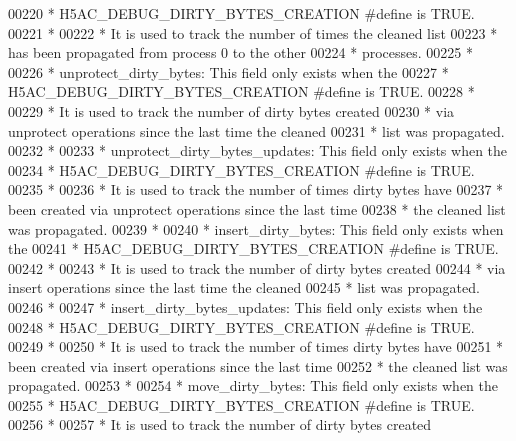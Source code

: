 \begin{DoxyCode}
00220 \textcolor{comment}{ *      H5AC\_DEBUG\_DIRTY\_BYTES\_CREATION #define is TRUE.}
00221 \textcolor{comment}{ *}
00222 \textcolor{comment}{ *      It is used to track the number of times the cleaned list}
00223 \textcolor{comment}{ *      has been propagated from process 0 to the other}
00224 \textcolor{comment}{ *      processes.}
00225 \textcolor{comment}{ *}
00226 \textcolor{comment}{ * unprotect\_dirty\_bytes:  This field only exists when the}
00227 \textcolor{comment}{ *              H5AC\_DEBUG\_DIRTY\_BYTES\_CREATION #define is TRUE.}
00228 \textcolor{comment}{ *}
00229 \textcolor{comment}{ *      It is used to track the number of dirty bytes created}
00230 \textcolor{comment}{ *      via unprotect operations since the last time the cleaned}
00231 \textcolor{comment}{ *      list was propagated.}
00232 \textcolor{comment}{ *}
00233 \textcolor{comment}{ * unprotect\_dirty\_bytes\_updates: This field only exists when the}
00234 \textcolor{comment}{ *              H5AC\_DEBUG\_DIRTY\_BYTES\_CREATION #define is TRUE.}
00235 \textcolor{comment}{ *}
00236 \textcolor{comment}{ *      It is used to track the number of times dirty bytes have}
00237 \textcolor{comment}{ *      been created via unprotect operations since the last time}
00238 \textcolor{comment}{ *      the cleaned list was propagated.}
00239 \textcolor{comment}{ *}
00240 \textcolor{comment}{ * insert\_dirty\_bytes:  This field only exists when the}
00241 \textcolor{comment}{ *              H5AC\_DEBUG\_DIRTY\_BYTES\_CREATION #define is TRUE.}
00242 \textcolor{comment}{ *}
00243 \textcolor{comment}{ *      It is used to track the number of dirty bytes created}
00244 \textcolor{comment}{ *      via insert operations since the last time the cleaned}
00245 \textcolor{comment}{ *      list was propagated.}
00246 \textcolor{comment}{ *}
00247 \textcolor{comment}{ * insert\_dirty\_bytes\_updates:  This field only exists when the}
00248 \textcolor{comment}{ *              H5AC\_DEBUG\_DIRTY\_BYTES\_CREATION #define is TRUE.}
00249 \textcolor{comment}{ *}
00250 \textcolor{comment}{ *      It is used to track the number of times dirty bytes have}
00251 \textcolor{comment}{ *      been created via insert operations since the last time}
00252 \textcolor{comment}{ *      the cleaned list was propagated.}
00253 \textcolor{comment}{ *}
00254 \textcolor{comment}{ * move\_dirty\_bytes:  This field only exists when the}
00255 \textcolor{comment}{ *              H5AC\_DEBUG\_DIRTY\_BYTES\_CREATION #define is TRUE.}
00256 \textcolor{comment}{ *}
00257 \textcolor{comment}{ *      It is used to track the number of dirty bytes created}

\end{DoxyCode}
